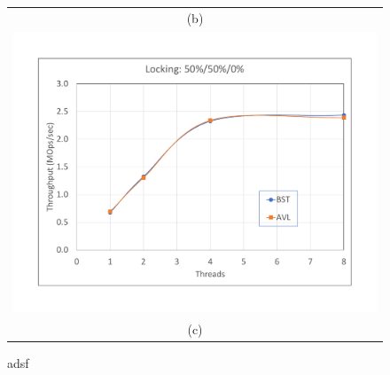 \documentclass[conference]{IEEEtran}
\begin{document}
\begin{figure}[H]
\begin{tabular}{c}
(b) \\
\includegraphics[width =\linewidth]{figures/conc-50-50-0} \\
(c) 
\end{tabular}
\caption{adsf}
\end{figure}
\end{document}

